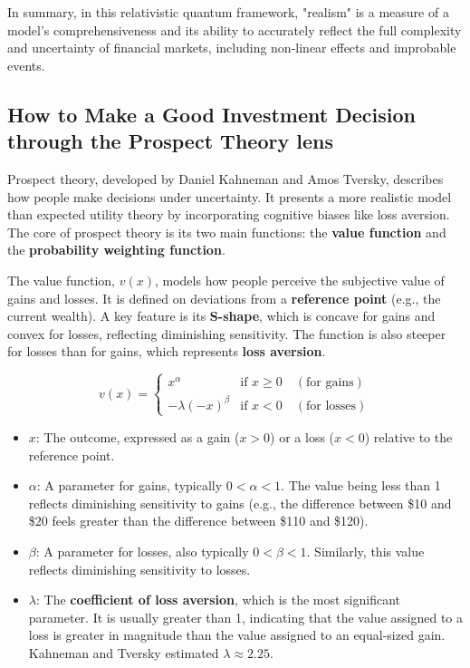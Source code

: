 \documentclass{article}
\begin{document}
 In summary, in this relativistic quantum framework,   "realism"   is a measure of a model's comprehensiveness and its ability to accurately reflect the full complexity and uncertainty of financial markets, including non-linear effects and improbable events.
 

\subsection{How to Make a Good Investment Decision through the Prospect Theory lens}
Prospect theory, developed by Daniel Kahneman and Amos Tversky, describes how people make decisions under uncertainty. It presents a more realistic model than expected utility theory by incorporating cognitive biases like loss aversion. The core of prospect theory is its two main functions: the \textbf{value function} and the \textbf{probability weighting function}.


The value function, $v(x)$, models how people perceive the subjective value of gains and losses. It is defined on deviations from a \textbf{reference point} (e.g., the current wealth). A key feature is its \textbf{S-shape}, which is concave for gains and convex for losses, reflecting diminishing sensitivity. The function is also steeper for losses than for gains, which represents \textbf{loss aversion}.

$$
v(x) =
\begin{cases}
    x^\alpha & \text{if } x \ge 0 \quad (\text{for gains}) \\
    -\lambda (-x)^\beta & \text{if } x < 0 \quad (\text{for losses})
\end{cases}
$$

\begin{itemize}
    \item $x$: The outcome, expressed as a gain ($x>0$) or a loss ($x<0$) relative to the reference point.
    \item $\alpha$: A parameter for gains, typically $0 < \alpha < 1$. The value being less than 1 reflects diminishing sensitivity to gains (e.g., the difference between \$10 and \$20 feels greater than the difference between \$110 and \$120).
    \item $\beta$: A parameter for losses, also typically $0 < \beta < 1$. Similarly, this value reflects diminishing sensitivity to losses.
    \item $\lambda$: The \textbf{coefficient of loss aversion}, which is the most significant parameter. It is usually greater than 1, indicating that the value assigned to a loss is greater in magnitude than the value assigned to an equal-sized gain. Kahneman and Tversky estimated $\lambda \approx 2.25$.
\end{itemize}
\end{document}
